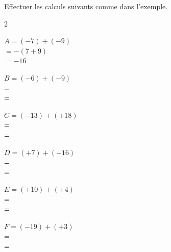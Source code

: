\documentclass[11pt]{article}
\begin{document}
\begin{exercice}[1]
Effectuer les calculs suivants comme dans l'exemple.

\begin{multicols}{2}

$A = (-7) + (-9)$\\
$= -(7 + 9)$\\
$= -16$

\bigskip

$B = (-6) + (-9)$\\
$= \dotfill$\\
$= \dotfill$

\bigskip

$C = (-13) + (+18)$\\
$= \dotfill$\\
$= \dotfill$

\columnbreak

$D = (+7) + (-16)$\\
$= \dotfill$\\
$= \dotfill$

\bigskip

$E = (+10) + (+4)$\\
$= \dotfill$\\
$= \dotfill$

\bigskip

$F = (-19) + (+3)$\\
$= \dotfill$\\
$= \dotfill$

\end{multicols}
\end{exercice}
\end{document}
